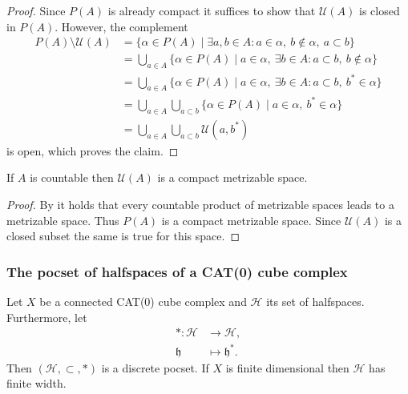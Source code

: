 \begin{proof}
  Since \(P(A)\) is already compact it suffices to show that \(\mathcal{U}(A)\) is closed in \(P(A)\). However, the complement
  \begin{align*}
    P(A) \setminus \mathcal{U}(A)
    & = \{\alpha \in P(A) \mid \exists a, b \in A\colon a \in \alpha,\ b \notin \alpha,\ a \subset b\}\\
    & = \bigcup_{a \in A} \{\alpha \in P(A) \mid a \in \alpha,\ \exists b \in A\colon a \subset b,\ b \notin \alpha\}\\
    & = \bigcup_{a \in A} \{\alpha \in P(A) \mid a \in \alpha,\ \exists b \in A\colon a \subset b,\ b^\ast \in \alpha\}\\
    & = \bigcup_{a \in A} \bigcup_{a \subset b}\{\alpha \in P(A) \mid a \in \alpha,\ b^\ast \in \alpha\}\\
    & = \bigcup_{a \in A} \bigcup_{a \subset b}\mathcal{U}(a, b^\ast)
  \end{align*}
  is open, which proves the claim.
\end{proof}

\begin{cor}
  \label{cor:comp-met-2}
  If \(A\) is countable then \(\mathcal{U}(A)\) is a compact metrizable space. 
\end{cor}

\begin{proof}
  By \textcite[Theorem~4.2.2]{Engelking} it holds that every countable product of metrizable spaces leads to a metrizable space. Thus \(P(A)\) is a compact metrizable space. Since \(\mathcal{U}(A)\) is a closed subset the same is true for this space.
\end{proof}


\subsubsection*{The pocset of halfspaces of a CAT(0) cube complex}
\label{pocset-halfspaces}

\begin{prop}
  \label{prop:pocset-halfspaces}
  Let \(X\) be a connected CAT(0) cube complex and \(\mathcal{H}\) its set of halfspaces. Furthermore, let
  \begin{align*}
    \ast \colon \mathcal{H} &\to \mathcal{H},\\
    \mathfrak{h} & \mapsto \mathfrak{h}^\ast.
  \end{align*}
  Then \((\mathcal{H}, \subset, \ast)\) is a discrete pocset. If \(X\) is finite dimensional then \(\mathcal{H}\) has finite width.
\end{prop}


